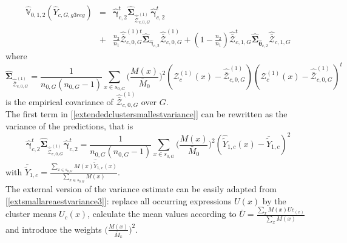 \documentclass[a4paper,12pt,leqno, titlepage]{article}
\newcommand{\VAR}{\mathbb{V}}
\begin{document}
\begin{eqnarray}\label{extendedclustersmallestvariance}
\hat{\VAR}_{0,1,2}(\hat{Y}_{c,G,g3reg}) &=&\hat{\pmb{\gamma}}^t_{c,2}\hat{\pmb{\Sigma}}_{\hat{\bar{\pmb{\mathcal{Z}}}}_{c,0,G}^{(1)}}\hat{\pmb{\gamma}}^t_{c,2} \nonumber \\
&+& \frac{n_2}{n_1}\hat{\bar{\pmb{\mathcal{Z}}}}_{c,0,G}^{(1)t}\hat{\pmb{\Sigma}}_{\hat{\pmb{\gamma}}_{c,2}}
\hat{\bar{\pmb{\mathcal{Z}}}}_{c,0,G}^{(1)}+(1-\frac{n_2}{n_1})\hat{\bar{\pmb{\mathcal{Z}}}}_{c,1,G}^t\hat{\pmb{\Sigma}}_{\hat{\pmb{\theta}}_{c,2}}
\hat{\bar{\pmb{\mathcal{Z}}}}_{c,1,G}
\end{eqnarray}
\noindent where
\begin{equation*}
\hat{\pmb{\Sigma}}_{\hat{\bar{\pmb{\mathcal{Z}}}}_{c,0,G}^{(1)}}=
\frac{1}{n_{0,G}(n_{0,G}-1)}\sum_{x\in{s_{0,G}}}\Big(\frac{M(x)}{\bar{M}_0}\Big)^2
(\pmb{\mathcal{Z}}^{(1)}_c(x)-\hat{\bar{\pmb{\mathcal{Z}}}}^{(1)}_{c,0,G})(\pmb{\mathcal{Z}}^{(1)}_c(x)-\hat{\bar{\pmb{\mathcal{Z}}}}^{(1)}_{c,0,G})^t
\end{equation*}
is the empirical covariance of $\hat{\bar{\pmb{\mathcal{Z}}}}_{c,0,G}^{(1)}$ over $G$.\\
The first term in [\ref{extendedclustersmallestvariance}] can be rewritten as the variance of the predictions, that is
\begin{equation*}
\hat{\pmb{\gamma}}^t_{c,2}\hat{\pmb{\Sigma}}_{\hat{\bar{\pmb{\mathcal{Z}}}}_{c,0,G}^{(1)}}\hat{\pmb{\gamma}}^t_{c,2}
=\frac{1}{n_{0,G}(n_{0,G}-1)}\sum_{x\in{s_{0,G}}}\Big(\frac{M(x)}{\bar{M}_0}\Big)^2
(\hat{\tilde{Y}}_{1,c}(x)-\bar{\tilde{Y}}_{1,c})^2
\end{equation*}
\noindent with $\bar{\tilde{Y}}_{1,c}=\frac{\sum_{x\in{s_{0,G}}}M(x)\hat{\tilde{Y}}_{1,c}(x)}{\sum_{x\in{s_{0,G}}}M(x)}$. \\
The external version of the variance estimate can be easily adapted from [\ref{extsmallareaestvariance3}]: replace all occurring expressions $U(x)$ by the cluster means $U_c(x)$, calculate the mean values according to
$\bar{U}=\frac{\sum_x M(x)Uc_(x)}{\sum_x M(x)}$ and introduce the weights $\Big(\frac{M(x)}{\bar{M}_k}\Big)^2$.\\
\end{document}
